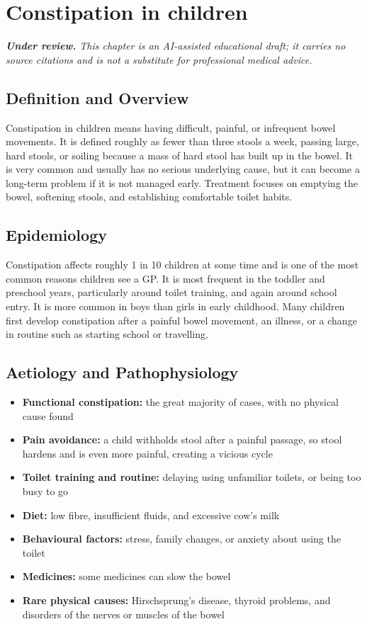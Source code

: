 \chapter{Constipation in children}

\medskip
\noindent\textit{\textbf{Under review.} This chapter is an AI-assisted educational draft; it carries no source citations and is not a substitute for professional medical advice.}

\section*{Definition and Overview}
Constipation in children means having difficult, painful, or infrequent bowel movements. It is defined roughly as fewer than three stools a week, passing large, hard stools, or soiling because a mass of hard stool has built up in the bowel. It is very common and usually has no serious underlying cause, but it can become a long-term problem if it is not managed early. Treatment focuses on emptying the bowel, softening stools, and establishing comfortable toilet habits.

\section*{Epidemiology}
Constipation affects roughly 1 in 10 children at some time and is one of the most common reasons children see a GP. It is most frequent in the toddler and preschool years, particularly around toilet training, and again around school entry. It is more common in boys than girls in early childhood. Many children first develop constipation after a painful bowel movement, an illness, or a change in routine such as starting school or travelling.

\section*{Aetiology and Pathophysiology}
\begin{itemize}
    \item \textbf{Functional constipation:} the great majority of cases, with no physical cause found
    \item \textbf{Pain avoidance:} a child withholds stool after a painful passage, so stool hardens and is even more painful, creating a vicious cycle
    \item \textbf{Toilet training and routine:} delaying using unfamiliar toilets, or being too busy to go
    \item \textbf{Diet:} low fibre, insufficient fluids, and excessive cow's milk
    \item \textbf{Behavioural factors:} stress, family changes, or anxiety about using the toilet
    \item \textbf{Medicines:} some medicines can slow the bowel
    \item \textbf{Rare physical causes:} Hirschsprung's disease, thyroid problems, and disorders of the nerves or muscles of the bowel
\end{itemize}

